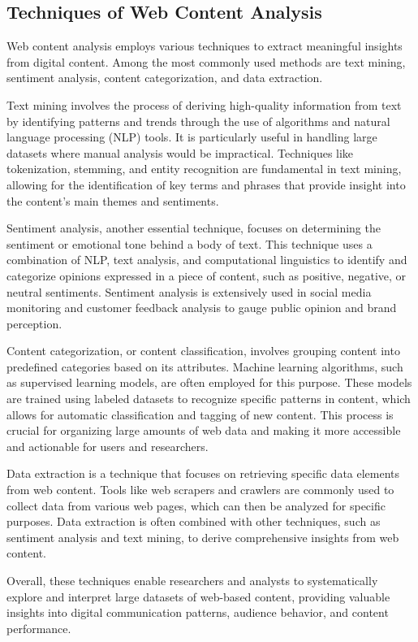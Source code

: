\subsection{Techniques of Web Content Analysis}
\label{subsec:techniques_of_web_content_analysis}
Web content analysis employs various techniques to extract meaningful insights from digital content.
Among the most commonly used methods are text mining, sentiment analysis, content categorization, and data extraction.

Text mining involves the process of deriving high-quality information from text by identifying patterns and trends through the use of algorithms and natural language processing (NLP) tools.
It is particularly useful in handling large datasets where manual analysis would be impractical.
Techniques like tokenization, stemming, and entity recognition are fundamental in text mining, allowing for the identification of key terms and phrases that provide insight into the content's main themes and sentiments.

Sentiment analysis, another essential technique, focuses on determining the sentiment or emotional tone behind a body of text.
This technique uses a combination of NLP, text analysis, and computational linguistics to identify and categorize opinions expressed in a piece of content, such as positive, negative, or neutral sentiments.
Sentiment analysis is extensively used in social media monitoring and customer feedback analysis to gauge public opinion and brand perception.

Content categorization, or content classification, involves grouping content into predefined categories based on its attributes.
Machine learning algorithms, such as supervised learning models, are often employed for this purpose.
These models are trained using labeled datasets to recognize specific patterns in content, which allows for automatic classification and tagging of new content.
This process is crucial for organizing large amounts of web data and making it more accessible and actionable for users and researchers.

Data extraction is a technique that focuses on retrieving specific data elements from web content.
Tools like web scrapers and crawlers are commonly used to collect data from various web pages, which can then be analyzed for specific purposes.
Data extraction is often combined with other techniques, such as sentiment analysis and text mining, to derive comprehensive insights from web content.

Overall, these techniques enable researchers and analysts to systematically explore and interpret large datasets of web-based content, providing valuable insights into digital communication patterns, audience behavior, and content performance.

